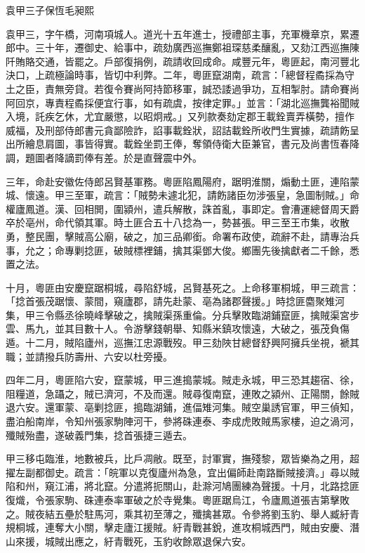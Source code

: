 
\begin{pinyinscope}
袁甲三子保恆毛昶熙

袁甲三，字午橋，河南項城人。道光十五年進士，授禮部主事，充軍機章京，累遷郎中。三十年，遷御史、給事中，疏劾廣西巡撫鄭祖琛慈柔釀亂，又劾江西巡撫陳阡賄賂交通，皆罷之。戶部復捐例，疏請收回成命。咸豐元年，粵匪起，南河豐北決口，上疏極論時事，皆切中利弊。二年，粵匪竄湖南，疏言：「總督程矞採為守土之臣，責無旁貸。若復令賽尚阿持節移軍，誠恐諉過爭功，互相掣肘。請命賽尚阿回京，專責程矞採便宜行事，如有疏虞，按律定罪。」並言：「湖北巡撫龔裕聞賊入境，託疾乞休，尤宜嚴懲，以昭炯戒。」又列款奏劾定郡王載銓賣弄橫勢，擅作威福，及刑部侍郎書元貪鄙險詐，諂事載銓狀，詔詰載銓所收門生實據，疏請飭呈出所繪息肩圖，事皆得實。載銓坐罰王俸，奪領侍衛大臣兼官，書元及尚書恆春降調，題圖者降謫罰俸有差。於是直聲震中外。

三年，命赴安徽佐侍郎呂賢基軍務。粵匪陷鳳陽府，踞明淮關，煽動土匪，連陷蒙城、懷遠。甲三至軍，疏言：「賊勢未遽北犯，請飭諸臣勿涉張皇，急圖制賊。」命權廬鳳道。漢、回相閧，圍潁州，遣兵解散，誅首亂，事即定。會漕運總督周天爵卒於亳州，命代領其軍。時土匪合五十八捻為一，勢甚張。甲三至王市集，收散勇，整民團，擊賊高公廟，破之，加三品卿銜。命署布政使，疏辭不赴，請專治兵事，允之；命專剿捻匪，破賊標裡鋪，擒其渠鄧大俊。鄉團先後擒獻者二千餘，悉置之法。

十月，粵匪由安慶竄踞桐城，尋陷舒城，呂賢基死之。上命移軍桐城，甲三疏言：「捻首張茂踞懷、蒙間，窺廬郡，請先赴蒙、亳為諸郡聲援。」時捻匪麕聚雉河集，甲三令縣丞徐曉峰擊破之，擒賊渠孫重倫。分兵擊敗臨湖鋪竄匪，擒賊渠宮步雲、馬九，並其目數十人。令游擊錢朝舉、知縣米鎮攻懷遠，大破之，張茂負傷遁。十二月，賊陷廬州，巡撫江忠源戰歿。甲三劾陜甘總督舒興阿擁兵坐視，褫其職；並請撥兵防壽卅、六安以杜旁擾。

四年二月，粵匪陷六安，竄蒙城，甲三進搗蒙城。賊走永城，甲三恐其趨宿、徐，阻糧道，急躡之，賊已濟河，不及而還。賊尋復南竄，連敗之潁州、正陽關，餘賊退六安。還軍蒙、亳剿捻匪，搗臨湖鋪，進偪雉河集。賊空巢誘官軍，甲三偵知，盡泊船南岸，令知州張家駒陣河干，參將硃連泰、李成虎敗賊馬家樓，迫之渦河，殲賊殆盡，遂破義門集，捻首張捷三遁去。

甲三移屯臨淮，地數被兵，比戶凋敝。既至，討軍實，撫殘黎，眾皆樂為之用，超擢左副都御史。疏言：「皖軍以克復廬州為急，宜出偏師赴南路斷賊接濟。」尋以賊陷和州，窺江浦，將北竄。分遣將扼關山，赴滁河鳩團練為聲援。十月，北路捻匪復熾，令張家駒、硃連泰率軍破之於寺覺集。粵匪踞烏江，令廬鳳道張吉第擊敗之。賊夜結五壘於駐馬河，乘其初至薄之，殲擒甚眾。令參將劉玉豹、舉人臧紆青規桐城，連奪大小關，擊走廬江援賊。紆青戰甚銳，進攻桐城西門，賊由安慶、潛山來援，城賊出應之，紆青戰死，玉豹收餘眾退保六安。


\end{pinyinscope}

